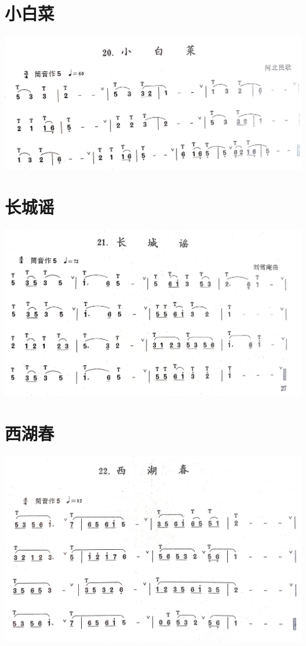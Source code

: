 \documentclass[cn,pad,chinese,chinesefont=nofont]{elegantbook}
\begin{document}
\section{小白菜}            
	\includegraphics[width=\textwidth]{dongxiao/IMG_0933.jpg}                  
\section{长城谣}
	\includegraphics[width=\textwidth]{dongxiao/IMG_0934.jpg}       
\section{西湖春}          
	\includegraphics[width=\textwidth]{dongxiao/IMG_0935.jpg}     
\end{document}
